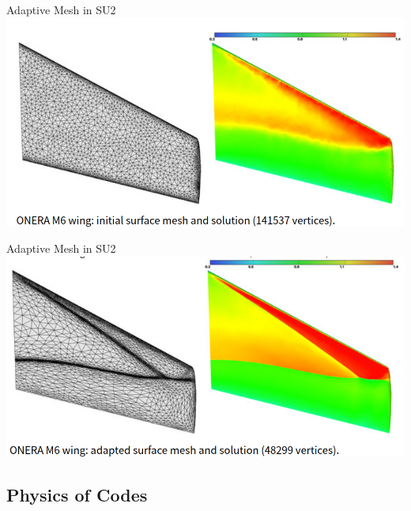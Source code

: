\begin{frame}{Adaptive Mesh in SU2}
\includegraphics[width=\linewidth]{figures/ONERA_Wing_Initial_Mesh.png}
\end{frame}

\begin{frame}{Adaptive Mesh in SU2}
\includegraphics[width=\linewidth]{figures/ONERA_Wing_Adapted_Mesh.png}
\end{frame}

\subsection{Physics of Codes}

